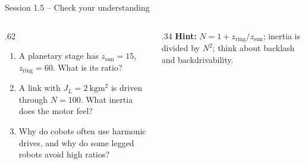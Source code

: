 \documentclass[aspectratio=169,10pt]{beamer}
\begin{document}
\begin{frame}{Session 1.5 -- Check your understanding}
\begin{columns}[T]
\begin{column}{.62\textwidth}
\begin{keybox}
\begin{enumerate}\setlength\itemsep{6pt}
\item A planetary stage has $z_\text{sun}=15$, $z_\text{ring}=60$. What is its ratio?
\item A link with $J_L=\SI{2}{\kilo\gram\metre\squared}$ is driven through $N=100$. What inertia does the motor feel?
\item Why do cobots often use harmonic drives, and why do some legged robots avoid high ratios?
\end{enumerate}
\end{keybox}
\end{column}
\begin{column}{.34\textwidth}
\small
\textbf{Hint:} $N=1+z_\text{ring}/z_\text{sun}$; inertia is divided by $N^2$; think about backlash and backdrivability.
\end{column}
\end{columns}
\end{frame}
\end{document}
